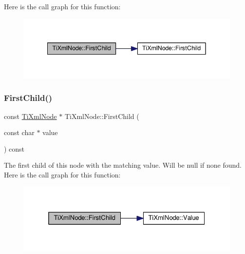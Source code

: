 Here is the call graph for this function\+:\nopagebreak
\begin{figure}[H]
\begin{center}
\leavevmode
\includegraphics[width=342pt]{class_ti_xml_node_a5e97d69b7c0ebd27fb7286be56559b77_cgraph}
\end{center}
\end{figure}
\mbox{\label{class_ti_xml_node_ae98c367f664890c4b5a5183481ec128a}} 
\subsubsection{\texorpdfstring{First\+Child()}{FirstChild()}\hspace{0.1cm}{\footnotesize\ttfamily [3/4]}}
{\footnotesize\ttfamily const \hyperlink{class_ti_xml_node}{Ti\+Xml\+Node} $\ast$ Ti\+Xml\+Node\+::\+First\+Child (\begin{DoxyParamCaption}\item[{const char $\ast$}]{value }\end{DoxyParamCaption}) const}

The first child of this node with the matching \textquotesingle{}value\textquotesingle{}. Will be null if none found. Here is the call graph for this function\+:\nopagebreak
\begin{figure}[H]
\begin{center}
\leavevmode
\includegraphics[width=325pt]{class_ti_xml_node_ae98c367f664890c4b5a5183481ec128a_cgraph}
\end{center}
\end{figure}
\mbox{\label{class_ti_xml_node_abc8bf32be6419ec453a731868de19554}} 
